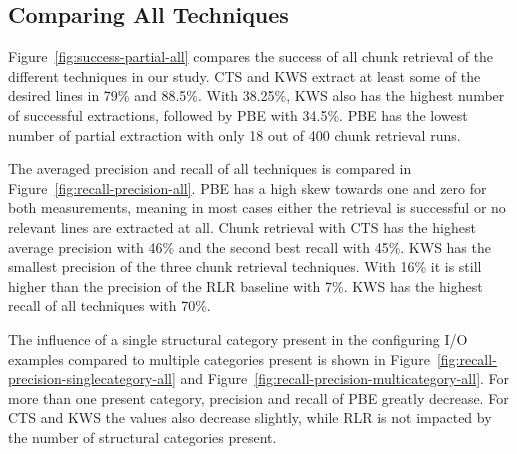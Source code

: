 \documentclass[\myrootdir/main.tex]{subfiles}
\begin{document}

\subsection{Comparing All Techniques}
Figure~\ref{fig:success-partial-all} compares the success of all chunk retrieval of the different techniques in our study.
CTS and KWS extract at least some of the desired lines in 79\% and 88.5\%.
With 38.25\%, KWS also has the highest number of successful extractions, followed by PBE with 34.5\%.
PBE has the lowest number of partial extraction with only 18 out of 400 chunk retrieval runs.

The averaged precision and recall of all techniques is compared in Figure~\ref{fig:recall-precision-all}.
PBE has a high skew towards one and zero for both measurements, meaning in most cases either the retrieval is successful or no relevant lines are extracted at all.
Chunk retrieval with CTS has the highest average precision with 46\% and the second best recall with 45\%.
KWS has the smallest precision of the three chunk retrieval techniques.
With 16\% it is still higher than the precision of the RLR baseline with 7\%.
KWS has the highest recall of all techniques with 70\%.

The influence of a single structural category present in the configuring I/O examples compared to multiple categories present is shown in Figure~\ref{fig:recall-precision-singlecategory-all} and Figure~\ref{fig:recall-precision-multicategory-all}.
For more than one present category, precision and recall of PBE greatly decrease.
For CTS and KWS the values also decrease slightly, while RLR is not impacted by the number of structural categories present.
\end{document}
